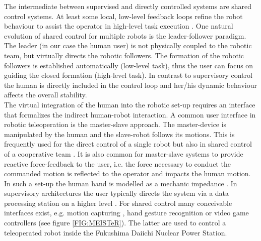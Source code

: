 \documentclass[a4paper,twoside, openright,12pt]{report}
\begin{document}
The intermediate between supervised and directly controlled systems are shared control systems. At least some local, low-level feedback loops refine the robot behaviour to assist the operator in high-level task execution \cite{TeleoperationHandbook}. One natural evolution of shared control for multiple robots is the leader-follower paradigm. The leader (in our case the human user) is not physically coupled to the robotic team, but virtually directs the robotic followers. The formation of the robotic followers is established automatically (low-level task), thus the user can focus on guiding the closed formation (high-level task). In contrast to supervisory control the human is directly included in the control loop and her/his dynamic behaviour affects the overall stability.\\
The virtual integration of the human into the robotic set-up requires an interface that formalizes the indirect human-robot interaction. A common user interface in robotic teleoperation is the master-slave approach. The master-device is manipulated by the human and the slave-robot follows its motions. This is frequently used for the direct control of a single robot but also in shared control of a cooperative team \cite{Lee_05}. It is also common for master-slave systems to provide reactive force-feedback to the user, i.e. the force necessary to conduct the commanded motion is reflected to the operator and impacts the human motion. In such a set-up the human hand is modelled as a mechanic impedance \cite{Hogan_89}. In supervisory architectures the user typically directs the system via a data processing station on a higher level \cite{Peters_15}. For shared control many conceivable interfaces exist, e.g. motion capturing \cite{Sieber_15}, hand gesture recognition \cite{Gioioso_2014} or video game controllers (see figure \ref{FIG:MEISTeR}). The latter are used to control a teleoperated robot inside the Fukushima Daiichi Nuclear Power Station.
\end{document}
